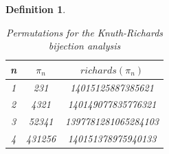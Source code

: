 \documentclass[12pt]{article}
\newtheorem{definition}{Definition}
\begin{document}
\begin{definition}
\begin{table}[H]
\caption{Permutations for the Knuth-Richards bijection analysis}
\centering
\begin{tabular}{c | c c}
\hline\hline
n & $\pi_n$ & $richards(\pi_n)$ \\ [0.5ex]
\hline
1 & 231 & 14015125887385621 \\
2 & 4321 & 140149077835776321 \\
3 & 52341 & 1397781281065284103\\
4 & 431256 & 140151378975940133 \\
\hline
\end{tabular}
\label{table:KnuthRichards}
\end{table}
\newpage



\end{definition}
\end{document}
